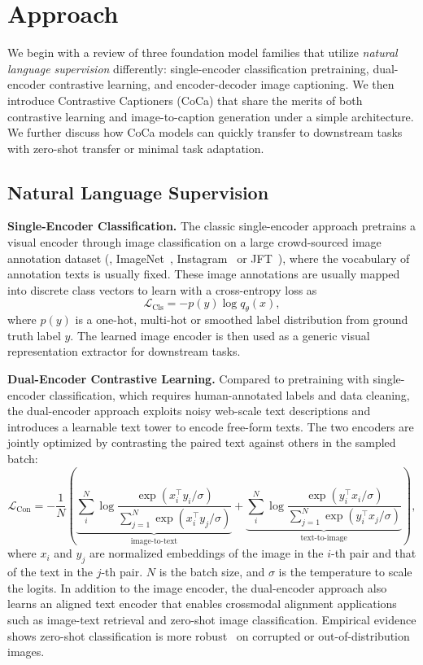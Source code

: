 \section{Approach}
We begin with a review of three foundation model families that utilize \textit{natural language supervision} differently: single-encoder classification pretraining, dual-encoder contrastive learning, and encoder-decoder image captioning. We then introduce Contrastive Captioners (CoCa) that share the merits of both contrastive learning and image-to-caption generation under a simple architecture. We further discuss how CoCa models can quickly transfer to downstream tasks with zero-shot transfer or minimal task adaptation.

\subsection{Natural Language Supervision}
\textbf{Single-Encoder Classification.}
The classic single-encoder approach pretrains a visual encoder through image classification on a large crowd-sourced image annotation dataset (\eg, ImageNet~\cite{deng2009imagenet}, Instagram~\cite{mahajan2018exploring} or JFT~\cite{zhai2021scaling}), where the vocabulary of annotation texts is usually fixed.
These image annotations are usually mapped into discrete class vectors to learn with a cross-entropy loss as
\begin{equation}
    \mathcal{L}_{\text{Cls}} = -p(y)\log q_{\theta}(x),
    \label{eq:main}
\end{equation}
where \(p(y)\) is a one-hot, multi-hot or smoothed label distribution from ground truth label \(y\).
The learned image encoder is then used as a generic visual representation extractor for downstream tasks.

\textbf{Dual-Encoder Contrastive Learning.}
Compared to pretraining with single-encoder classification, which requires human-annotated labels and data cleaning,
the dual-encoder approach exploits noisy web-scale text descriptions 
and introduces a learnable text tower to encode free-form texts.
The two encoders are jointly optimized
by contrasting the paired text against others in the sampled batch:
\begin{equation}
   \mathcal{L}_{\text{Con}} = -\frac{1}{N}
    (\underbrace{\sum_i^N\log{\frac{\exp(x_i^\top y_i / \sigma)}{\sum_{j=1}^{N} \exp(x_i^\top y_j / \sigma)}}}_\text{image-to-text} +
    \underbrace{\sum_i^N\log{\frac{\exp(y_i^\top x_i / \sigma)}{\sum_{j=1}^{N} \exp(y_i^\top x_j / \sigma)}}}_\text{text-to-image}),
\end{equation}
where \(x_i\) and \(y_j\) are normalized embeddings of the image in the $i$-th pair and that of the text in the \(j\)-th pair. \(N\) is the batch size, and \(\sigma\) is the temperature to scale the logits.
In addition to the image encoder,
the dual-encoder approach also learns an aligned text encoder that enables crossmodal alignment applications such as image-text retrieval and zero-shot image classification. Empirical evidence shows zero-shot classification is more robust~\cite{radford2021learning, jia2021scaling, andreassen2021evolution} on corrupted or out-of-distribution images.

